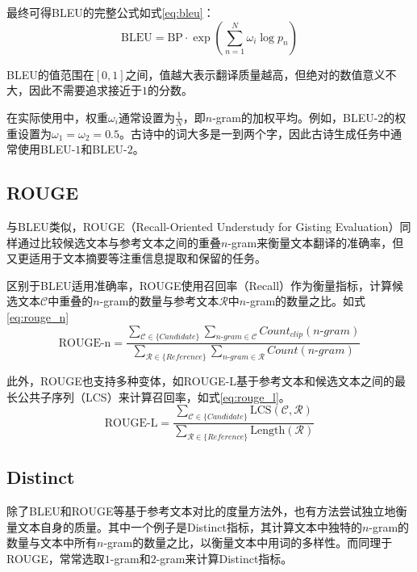 最终可得BLEU的完整公式如式\eqref{eq:bleu}：
\begin{equation}
    \mathrm{BLEU}=\mathrm{BP}\cdot\exp\left(\sum^N_{n=1} \omega_i\log p_n\right) \label{eq:bleu}
\end{equation}

BLEU的值范围在$[0,1]$之间，值越大表示翻译质量越高，但绝对的数值意义不大，因此不需要追求接近于$1$的分数。

在实际使用中，权重$\omega_i$通常设置为$\frac{1}{N}$，即$n$-gram的加权平均。例如，BLEU-$2$的权重设置为$\omega_1=\omega_2=0.5$。古诗中的词大多是一到两个字，因此古诗生成任务中通常使用BLEU-$1$和BLEU-$2$。

\subsection{ROUGE} \label{sec:rouge}
与BLEU类似，ROUGE（Recall-Oriented Understudy for Gisting Evaluation）同样通过比较候选文本与参考文本之间的重叠$n$-gram来衡量文本翻译的准确率，但又更适用于文本摘要等注重信息提取和保留的任务。

区别于BLEU适用准确率，ROUGE使用召回率（Recall）作为衡量指标，计算候选文本$\mathcal C$中重叠的$n$-gram的数量与参考文本$\mathcal R$中$n$-gram的数量之比。如式\eqref{eq:rouge_n}
\begin{equation}
    \text{ROUGE-n} = \frac{\sum_{\mathcal C \in\{Candidate\}} \sum_{n\mbox{-}gram\in\mathcal C} Count_{clip}(n\mbox{-}gram)}{\sum_{\mathcal R \in\{Reference\}} \sum_{n\mbox{-}gram\in\mathcal R} Count(n\mbox{-}gram)} \label{eq:rouge_n}
\end{equation}

此外，ROUGE也支持多种变体，如ROUGE-L基于参考文本和候选文本之间的最长公共子序列（LCS）来计算召回率，如式\eqref{eq:rouge_l}。
\begin{equation}
    \text{ROUGE-L} = \frac{\sum_{\mathcal C \in\{Candidate\}} \text{LCS}(\mathcal C,\mathcal R)}{\sum_{\mathcal R \in\{Reference\}}\text{Length}(\mathcal R)} \label{eq:rouge_l}
\end{equation}

\subsection{Distinct}
除了BLEU和ROUGE等基于参考文本对比的度量方法外，也有方法尝试独立地衡量文本自身的质量。其中一个例子是Distinct指标，其计算文本中独特的$n$-gram的数量与文本中所有$n$-gram的数量之比，以衡量文本中用词的多样性。而同理于ROUGE，常常选取$1$-gram和$2$-gram来计算Distinct指标。

